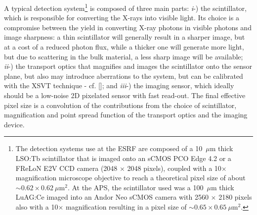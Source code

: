 \begin{refsection}
A typical detection system\footnote{The detection systems use at the ESRF are composed of a 10~$\mu$m thick LSO:Tb scintillator that is imaged onto an sCMOS PCO Edge 4.2 or a FReLoN E2V CCD camera (2048 $\times$ 2048 pixels), coupled with a 10$\times$ magnification microscope objective to reach a theoretical pixel size of about $\sim0.62\times0.62~\mu$m$^2$. At the APS, the scintillator used was a 100~$\mu$m thick LuAG:Ce imaged into an Andor Neo sCMOS camera with 2560 $\times$ 2180 pixels also with a 10$\times$ magnification resulting in a pixel size of $\sim0.65\times0.65~\mu$m$^2$.} is composed of three main parts: \textit{i}-) the scintillator, which is responsible for converting the X-rays into visible light. Its choice is a compromise between the yield in converting X-ray photons in visible photons and image sharpness: a thin scintillator will generally result in a sharper image, but at a cost of a reduced photon flux, while a thicker one will generate more light, but due to scattering in the bulk material, a less sharp image will be available; \textit{ii}-) the transport optics that magnifies and images the scintillator onto the sensor plane, but also may introduce aberrations to the system, but can be calibrated with the XSVT technique - cf. [\cite[\textit{\S2.2}]{Berujon2020a}]; and \textit{iii}-) the imaging sensor, which ideally should be a low-noise 2D pixelated sensor with fast read-out. The final effective pixel size is a convolution of the contributions from the choice of scintillator, magnification and point spread function of the transport optics and the imaging device.


\end{refsection}
